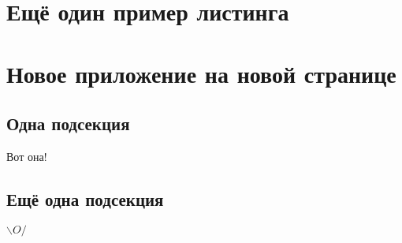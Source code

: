 \begin{append}
	
	\section{Ещё один пример листинга} \label{app:matlab}

	\lstset{style=matlab, stepnumber=5}
	

	\section{Новое приложение на новой странице}

	\subsection{Одна подсекция}

	Вот она!

	\subsection{Ещё одна подсекция}

	{\Huge$\backslash O /$}

\end{append}